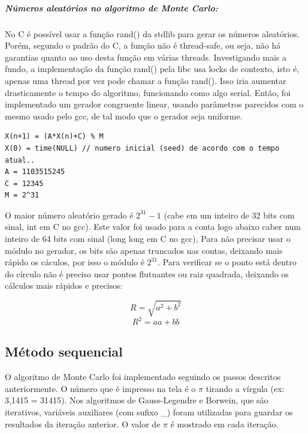 \documentclass[a4paper]{article}
\begin{document}
\subparagraph{Números aleatórios no algoritmo de Monte Carlo:}
No C é possível usar a função rand() da stdlib para gerar os números aleatórios. Porém, segundo
o padrão do C, a função não é thread-safe, ou seja, não há garantias quanto ao uso desta função
em várias threads. Investigando mais a fundo, a implementação da função rand() pela libc usa
locks de contexto, isto é, apenas uma thread por vez pode chamar a função rand(). Isso iria
aumentar drasticamente o tempo do algoritmo, funcionando como algo serial. Então, foi implementado 
um gerador congruente linear, usando parâmetros parecidos com o mesmo usado pelo gcc, de tal modo 
que o gerador seja uniforme.\\

\begin{lstlisting}[caption=Algoritmo do gerador congruente linear, float=h]
X(n+1) = (A*X(n)+C) % M
X(0) = time(NULL) // numero inicial (seed) de acordo com o tempo atual..
A = 1103515245
C = 12345
M = 2^31
\end{lstlisting}

O maior número aleatório gerado é \begin{math}2^{31} - 1\end{math} (cabe em um inteiro de 32 bits com sinal, int em C no gcc). 
Este valor foi usado para a conta logo abaixo caber num inteiro de 64 bits com sinal (long long em C no gcc), 
Para não precisar usar o módulo no gerador, os bits são apenas truncados nas contas, deixando mais 
rápido os cáculos, por isso o módulo é \begin{math}2^{31}\end{math}. Para verificar se o ponto está dentro do círculo não é preciso 
usar pontos flutuantes ou raiz quadrada, deixando os cálculos mais rápidos e precisos:

\begin{displaymath}
	R = \sqrt{a^2 + b^2}
\end{displaymath}
\begin{displaymath}
	R^2 = a a + b b
\end{displaymath}

\subsection{Método sequencial}
O algoritmo de Monte Carlo foi implementado seguindo os passos descritos anteriormente. 
O número que é impresso na tela é o \begin{math}\pi\end{math} tirando a vírgula (ex: 3,1415 = 31415). 
Nos algoritmos de  Gauss-Legendre e Borwein, que são iterativos, variáveis auxiliares
(com sufixo \_) foram utilizadas para guardar os resultados da iteração anterior. O
valor de \begin{math}\pi\end{math} é mostrado em cada iteração.
\end{document}
